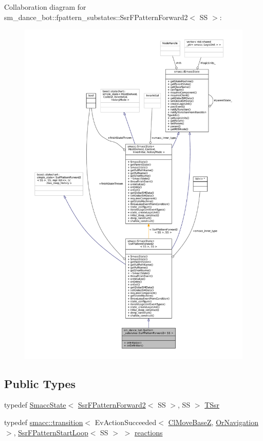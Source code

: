 Collaboration diagram for sm\+\_\+dance\+\_\+bot\+:\+:fpattern\+\_\+substates\+:\+:Ssr\+F\+Pattern\+Forward2$<$ SS $>$\+:
\nopagebreak
\begin{figure}[H]
\begin{center}
\leavevmode
\includegraphics[width=350pt]{structsm__dance__bot_1_1fpattern__substates_1_1SsrFPatternForward2__coll__graph}
\end{center}
\end{figure}
\subsection*{Public Types}
\begin{DoxyCompactItemize}
\item 
typedef \hyperlink{classSmaccState}{Smacc\+State}$<$ \hyperlink{structsm__dance__bot_1_1fpattern__substates_1_1SsrFPatternForward2}{Ssr\+F\+Pattern\+Forward2}$<$ SS $>$, SS $>$ \hyperlink{structsm__dance__bot_1_1fpattern__substates_1_1SsrFPatternForward2_affddf34f513a44dd335f230b294397ea}{T\+Ssr}
\item 
typedef \hyperlink{classsmacc_1_1transition}{smacc\+::transition}$<$ Ev\+Action\+Succeeded$<$ \hyperlink{classmove__base__z__client_1_1ClMoveBaseZ}{Cl\+Move\+BaseZ}, \hyperlink{classsm__dance__bot_1_1OrNavigation}{Or\+Navigation} $>$, \hyperlink{structsm__dance__bot_1_1fpattern__substates_1_1SsrFPatternStartLoop}{Ssr\+F\+Pattern\+Start\+Loop}$<$ SS $>$ $>$ \hyperlink{structsm__dance__bot_1_1fpattern__substates_1_1SsrFPatternForward2_a323b1557bde8fc8e8733260cec6c44bc}{reactions}
\end{DoxyCompactItemize}
